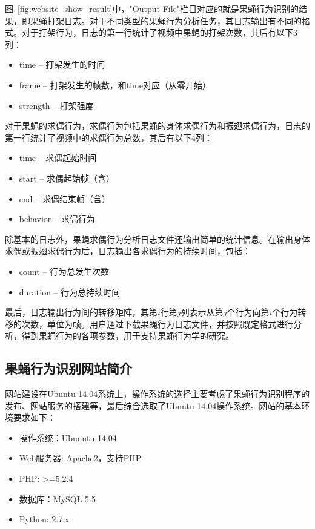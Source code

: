 图~\ref{fig:website_show_result}中，"Output File"栏目对应的就是果蝇行为识别的结果，即果蝇打架日志。对于不同类型的果蝇行为分析任务，其日志输出有不同的格式。对于打架行为，日志的第一行统计了视频中果蝇的打架次数，其后有以下3列：
\begin{itemize}
\item time – 打架发生的时间
\item frame – 打架发生的帧数，和time对应（从零开始）
\item strength – 打架强度
\end{itemize}
对于果蝇的求偶行为，求偶行为包括果蝇的身体求偶行为和振翅求偶行为，日志的第一行统计了视频中的求偶行为总数，其后有以下4列：
\begin{itemize}
\item time – 求偶起始时间
\item start – 求偶起始帧（含）
\item end – 求偶结束帧（含）
\item behavior – 求偶行为
\end{itemize}

除基本的日志外，果蝇求偶行为分析日志文件还输出简单的统计信息。在输出身体求偶或振翅求偶行为后，日志输出各求偶行为的持续时间，包括：
\begin{itemize}
\item count – 行为总发生次数
\item duration – 行为总持续时间
\end{itemize}
最后，日志输出行为间的转移矩阵，其第$i$行第$j$列表示从第$j$个行为向第$i$个行为转移的次数，单位为帧。用户通过下载果蝇行为日志文件，并按照既定格式进行分析，得到果蝇行为的各项参数，用于支持果蝇行为学的研究。

\subsection{果蝇行为识别网站简介}

网站建设在Ubuntu 14.04系统上，操作系统的选择主要考虑了果蝇行为识别程序的发布、网站服务的搭建等，最后综合选取了Ubuntu 14.04操作系统。网站的基本环境要求如下：
\begin{itemize}
    \item 操作系统：Ubunutu 14.04
    \item Web服务器: Apache2，支持PHP
    \item PHP: >=5.2.4
    \item 数据库：MySQL 5.5
    \item Python: 2.7.x
\end{itemize}

